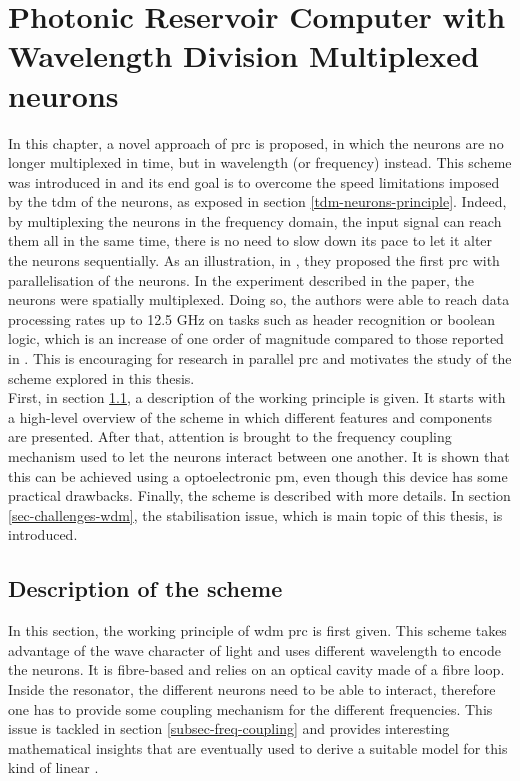 \chapter{Photonic Reservoir Computer with Wavelength Division Multiplexed neurons}

\label{ch-wdm-rc}

In this chapter, a novel approach of \gls{prc} is proposed, in which the neurons are no longer multiplexed in time, but in wavelength (or frequency) instead. This scheme was introduced in \cite{AkroutAkram2016Pprc} and its end goal is to overcome the speed limitations imposed by the \gls{tdm} of the neurons, as exposed in section \ref{tdm-neurons-principle}. Indeed, by multiplexing the neurons in the frequency domain, the input signal can reach them all in the same time, there is no need to slow down its pace to let it alter the neurons sequentially. As an illustration, in \cite{Vandoorne2014}, they proposed the first \gls{prc} with parallelisation of the neurons. In the experiment described in the paper, the neurons were spatially multiplexed. Doing so, the authors were able to reach data processing rates up to 12.5 GHz on tasks such as header recognition or boolean logic, which is an increase of one order of magnitude compared to those reported in \cite{Vinckier2015}. This is encouraging for research in parallel \gls{prc} and motivates the study of the scheme explored in this thesis.\\

First, in section \ref{sec-scheme-wdm}, a description of the working principle is given. It starts with a high-level overview of the scheme in which different features and components are presented. After that, attention is brought to the frequency coupling mechanism used to let the neurons interact between one another. It is shown that this can be achieved using a optoelectronic \gls{pm}, even though this device has some practical drawbacks. Finally, the scheme is described with more details. In section \ref{sec-challenges-wdm}, the stabilisation issue, which is main topic of this thesis, is introduced.


\section{Description of the scheme}

\label{sec-scheme-wdm}

In this section, the working principle of \gls{wdm} \gls{prc} is first given. This scheme takes advantage of the wave character of light and uses different wavelength to encode the neurons. It is fibre-based and relies on an optical cavity made of a fibre loop. Inside the resonator, the different neurons need to be able to interact, therefore one has to provide some coupling mechanism for the different frequencies. This issue is tackled in section \ref{subsec-freq-coupling} and provides interesting mathematical insights that are eventually used to derive a suitable model for this kind of linear \rcer.


